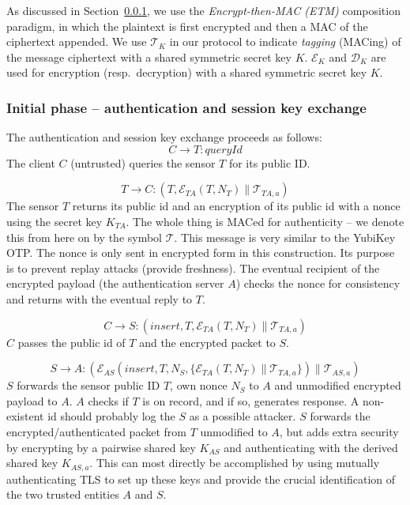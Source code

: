As discussed in Section~\ref{}, we use the \textit{Encrypt-then-MAC (ETM)}  composition paradigm, in which the plaintext is first encrypted and then a MAC of the ciphertext appended. We use $\mathcal{T}_K$ in our protocol to indicate \textit{tagging} (MACing) of the message ciphertext with a shared symmetric secret key $K$. $\mathcal{E}_K$ and $\mathcal{D}_K$ are used for encryption (resp.\ decryption) with a shared symmetric secret key $K$.

\subsubsection{Initial phase -- authentication and session key exchange}

The authentication and session key exchange proceeds as follows:
\[
C \rightarrow T: \textit{queryId}
\]
The client $C$ (untrusted) queries the sensor $T$ for its public ID.

\[
T \rightarrow C: (T,\mathcal{E}_{TA}(T,N_T) \parallel \mathcal{T}_{TA,a})
\]
The sensor $T$ returns its public id and an encryption of its public id with a nonce using the secret key $K_{TA}$. The whole thing is MACed for authenticity -- we denote this from here on by the symbol $\mathcal{T}$. This message is very similar to the YubiKey OTP. The nonce is only sent in encrypted form in this construction. Its purpose is to prevent replay attacks (provide freshness). The eventual recipient of the encrypted payload (the authentication server $A$) checks the nonce for consistency and returns with the eventual reply to $T$.

\[
C\rightarrow S: (insert,T,\mathcal{E}_{TA}(T,N_T) \parallel \mathcal{T}_{TA,a})
\]
$C$ passes the public id of $T$ and the encrypted packet to $S$.

\[
S \rightarrow A: (\mathcal{E}_{AS}(insert,T,N_S, \{ \mathcal{E}_{TA}(T,N_T) \parallel \mathcal{T}_{TA,a} \}) \parallel \mathcal{T}_{AS,a})
\]
$S$ forwards the sensor public ID $T$, own nonce $N_S$ to $A$ and unmodified encrypted payload to $A$. $A$ checks if $T$ is on record, and if so, generates response. A non-existent id should probably log the $S$ as a possible attacker. 
%
$S$ forwards the encrypted/authenticated packet from $T$ unmodified to $A$, but adds extra security by encrypting by a pairwise shared key $K_{AS}$ and authenticating with the derived shared key $K_{AS,a}$. This can most directly be accomplished by using mutually authenticating TLS to set up these keys and provide the crucial identification of the two trusted entities $A$ and $S$.

